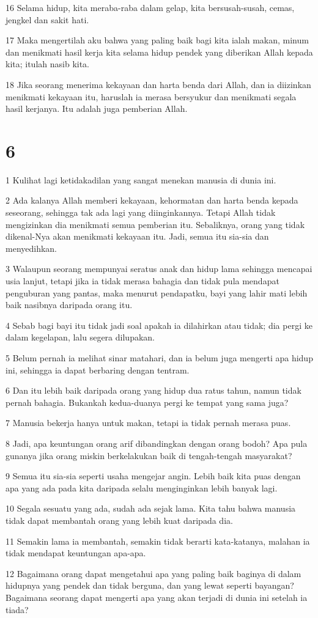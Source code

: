 \par 16 Selama hidup, kita meraba-raba dalam gelap, kita bersusah-susah, cemas, jengkel dan sakit hati.
\par 17 Maka mengertilah aku bahwa yang paling baik bagi kita ialah makan, minum dan menikmati hasil kerja kita selama hidup pendek yang diberikan Allah kepada kita; itulah nasib kita.
\par 18 Jika seorang menerima kekayaan dan harta benda dari Allah, dan ia diizinkan menikmati kekayaan itu, haruslah ia merasa bersyukur dan menikmati segala hasil kerjanya. Itu adalah juga pemberian Allah.

\chapter{6}

\par 1 Kulihat lagi ketidakadilan yang sangat menekan manusia di dunia ini.
\par 2 Ada kalanya Allah memberi kekayaan, kehormatan dan harta benda kepada seseorang, sehingga tak ada lagi yang diinginkannya. Tetapi Allah tidak mengizinkan dia menikmati semua pemberian itu. Sebaliknya, orang yang tidak dikenal-Nya akan menikmati kekayaan itu. Jadi, semua itu sia-sia dan menyedihkan.
\par 3 Walaupun seorang mempunyai seratus anak dan hidup lama sehingga mencapai usia lanjut, tetapi jika ia tidak merasa bahagia dan tidak pula mendapat penguburan yang pantas, maka menurut pendapatku, bayi yang lahir mati lebih baik nasibnya daripada orang itu.
\par 4 Sebab bagi bayi itu tidak jadi soal apakah ia dilahirkan atau tidak; dia pergi ke dalam kegelapan, lalu segera dilupakan.
\par 5 Belum pernah ia melihat sinar matahari, dan ia belum juga mengerti apa hidup ini, sehingga ia dapat berbaring dengan tentram.
\par 6 Dan itu lebih baik daripada orang yang hidup dua ratus tahun, namun tidak pernah bahagia. Bukankah kedua-duanya pergi ke tempat yang sama juga?
\par 7 Manusia bekerja hanya untuk makan, tetapi ia tidak pernah merasa puas.
\par 8 Jadi, apa keuntungan orang arif dibandingkan dengan orang bodoh? Apa pula gunanya jika orang miskin berkelakukan baik di tengah-tengah masyarakat?
\par 9 Semua itu sia-sia seperti usaha mengejar angin. Lebih baik kita puas dengan apa yang ada pada kita daripada selalu menginginkan lebih banyak lagi.
\par 10 Segala sesuatu yang ada, sudah ada sejak lama. Kita tahu bahwa manusia tidak dapat membantah orang yang lebih kuat daripada dia.
\par 11 Semakin lama ia membantah, semakin tidak berarti kata-katanya, malahan ia tidak mendapat keuntungan apa-apa.
\par 12 Bagaimana orang dapat mengetahui apa yang paling baik baginya di dalam hidupnya yang pendek dan tidak berguna, dan yang lewat seperti bayangan? Bagaimana seorang dapat mengerti apa yang akan terjadi di dunia ini setelah ia tiada?

